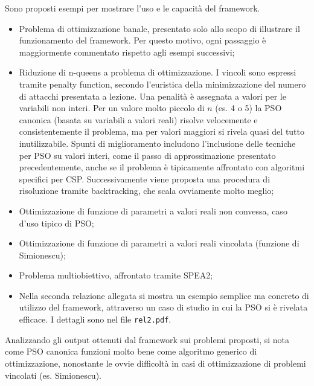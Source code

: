 \documentclass[12pt]{article}
\begin{document}
Sono proposti esempi per mostrare l'uso e le capacità del framework.
\begin{itemize}
\item Problema di ottimizzazione banale, presentato solo allo scopo di illustrare il funzionamento del framework. Per questo motivo, ogni passaggio è maggiormente commentato rispetto agli esempi successivi;
\item Riduzione di n-queens a problema di ottimizzazione. I vincoli sono espressi tramite penalty function, secondo l'euristica della minimizzazione del numero di attacchi presentata a lezione. Una penalità è assegnata a valori per le variabili non interi. Per un valore molto piccolo di $n$ (es. 4 o 5) la PSO canonica (basata su variabili a valori reali) risolve velocemente e consistentemente il problema, ma per valori maggiori si rivela quasi del tutto inutilizzabile. Spunti di miglioramento includono l'inclusione delle tecniche per PSO su valori interi, come il passo di approssimazione presentato precedentemente, anche se il problema è tipicamente affrontato con algoritmi specifici per CSP. Successivamente viene proposta una procedura di risoluzione tramite backtracking, che scala ovviamente molto meglio;
\item Ottimizzazione di funzione di parametri a valori reali non convessa, caso d'uso tipico di PSO;
\item Ottimizzazione di funzione di parametri a valori reali vincolata (funzione di Simionescu);
\item Problema multiobiettivo, affrontato tramite SPEA2;
\item Nella seconda relazione allegata si mostra un esempio semplice ma concreto di utilizzo del framework, attraverso un caso di studio in cui la PSO si è rivelata efficace. I dettagli sono nel file \texttt{rel2.pdf}.
\end{itemize}
Analizzando gli output ottenuti dal framework sui problemi proposti, si nota come PSO canonica funzioni molto bene come algoritmo generico di ottimizzazione, nonostante le ovvie difficoltà in casi di ottimizzazione di problemi vincolati (es. Simionescu). 
\end{document}
